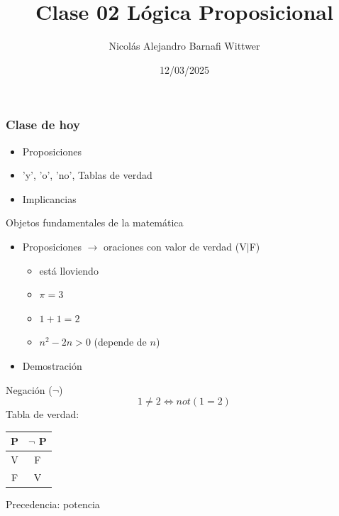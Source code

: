 \documentclass[14pt,aspectratio=169,xcolor=dvipsnames]{beamer}
\title[short title]{Clase 02 Lógica Proposicional}
\subtitle{}
\author[NA Barnafi] {Nicolás Alejandro Barnafi Wittwer}
\institute[UC|CMM] 
{
    Pontificia Universidad Católica de Chile \\
    Centro de Modelamiento Matemático
}
\date{12/03/2025}
\begin{document}
\begin{frame}
    \maketitle
\end{frame}
\begin{frame}\frametitle{Clase de hoy}
    \begin{itemize}
        \item Proposiciones
        \item 'y', 'o', 'no', Tablas de verdad
        \item Implicancias
    \end{itemize}

    \vspace{1cm}
\end{frame}
\begin{frame}{Objetos fundamentales de la matemática}
    \begin{itemize}
        \item Proposiciones $\to$ oraciones con valor de verdad (V$|$F)
            \begin{itemize}
                \item está lloviendo
                \item $\pi=3$
                \item $1+1=2$
                \item $n^2 -2n >0$ (depende de $n$)
            \end{itemize}
        \item Demostración
    \end{itemize}
\end{frame}
\begin{frame}{Negación ($\neg$)}
    $$ 1\neq 2 \Leftrightarrow  not( 1 = 2 )$$
    Tabla de verdad:
        \begin{center}
            \begin{tabular}{c | c}
                \toprule P & $\neg $ P  \\\midrule
                V & F \\
                F & V \\ \bottomrule
            \end{tabular}
        \end{center}
    Precedencia: potencia
\end{frame}
\end{document}
